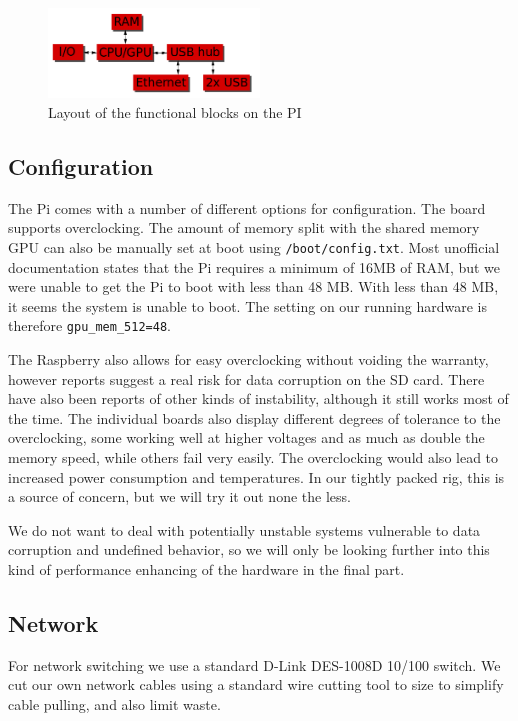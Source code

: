 \begin{figure}
	\centering
    \includegraphics[width=0.5\textwidth]{hardware/raspberrypi_block_function}
    \caption{Layout of the functional blocks on the PI}
    \label{fig:pi_blockdiagram}
\end{figure}

\subsection{Configuration}
The Pi comes with a number of different options for configuration. The board supports overclocking. The amount of memory split with the shared memory GPU can also be manually set at boot using {\tt /boot/config.txt}.
Most unofficial documentation states that the Pi requires a minimum of 16MB of RAM, but we were unable to get the Pi to boot with less than 48 MB. 
With less than 48 MB, it seems the system is unable to boot.
The setting on our running hardware is therefore {\tt gpu\_mem\_512=48}.

The Raspberry also allows for easy overclocking without voiding the warranty, however reports suggest a real risk for data corruption on the SD card. There have also been reports of other kinds of instability, although it still works most of the time. The individual boards also display different degrees of tolerance to the overclocking, some working well at higher voltages and as much as double the memory speed, while others fail very easily.
The overclocking would also lead to increased power consumption and temperatures. In our tightly packed rig, this is a source of concern, but we will try it out none the less.

We do not want to deal with potentially unstable systems vulnerable to data corruption and undefined behavior, so we will only be looking further into this kind of performance enhancing of the hardware in the final part.

\subsection{Network}
For network switching we use a standard D-Link DES-1008D 10/100 switch. We cut our own network cables using a standard wire cutting tool to size to simplify cable pulling, and also limit waste.

